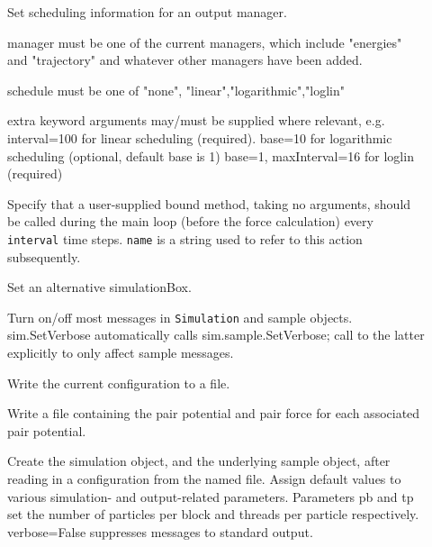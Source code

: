 \documentclass[a4paper]{article}
\begin{document}
\begin{description}
\item[]
  Set scheduling information for an output manager.
  
  manager must be one of the current managers, which include "energies"
  and "trajectory" and whatever other managers have been added.
  
  schedule must be one of "none", "linear","logarithmic","loglin"
  
  extra keyword arguments may/must be supplied where relevant, e.g.
  interval=100 for linear scheduling (required).
  base=10 for logarithmic scheduling (optional, default base is 1)
  base=1, maxInterval=16 for loglin (required)
  
  
  
\item[]
  Specify that a 
  user-supplied bound method, taking no arguments, should be called during the 
  main loop (before the force calculation) every \verb|interval| time steps.
  \verb|name| is a string used to refer to this action subsequently.

\item[]
  Set an alternative simulationBox.


\item[]
  Turn on/off most messages in \verb|Simulation| and sample objects.
  sim.SetVerbose automatically calls sim.sample.SetVerbose; call
  to the latter explicitly to only affect sample messages.
  
\item[]
  Write the current configuration to a file.
    
\item[]
  Write a file containing the pair potential
  and pair force for each associated pair potential.
  
\item[]
  Create the simulation object, and the underlying sample object, after
  reading in a configuration from the named file. Assign default values
  to various simulation- and output-related parameters. Parameters pb
  and tp set the number of particles per block and threads per particle
  respectively. verbose=False suppresses messages to standard output.

\end{description}
\end{document}
